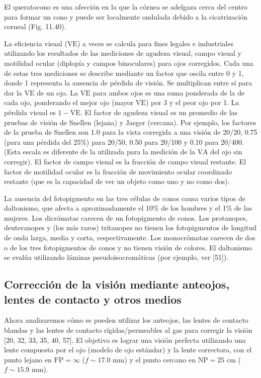 \documentclass[12pt]{book}
\begin{document}
El queratocono es una afección en la que la córnea se adelgaza cerca del centro para formar un cono y puede ser localmente ondulada debido a la cicatrización corneal (Fig. 11.40).

La eficiencia visual ($\text{VE}$) a veces se calcula para fines legales e industriales utilizando los resultados de las mediciones de agudeza visual, campo visual y motilidad ocular (diplopía y campos binoculares) para ojos corregidos. Cada una de estas tres mediciones se describe mediante un factor que oscila entre 0 y 1, donde 1 representa la ausencia de pérdida de visión. Se multiplican entre sí para dar la $\text{VE}$ de un ojo. La $\text{VE}$ para ambos ojos es una suma ponderada de la de cada ojo, ponderando el mejor ojo (mayor $\text{VE}$) por 3 y el peor ojo por 1. La pérdida visual es $1 - \text{VE}$. El factor de agudeza visual es un promedio de las pruebas de visión de Snellen (lejana) y Jaeger (cercana). Por ejemplo, los factores de la prueba de Snellen son 1.0 para la vista corregida a una visión de 20/20, 0.75 (para una pérdida del 25\%) para 20/50, 0.50 para 20/100 y 0.10 para 20/400. (Esta escala es diferente de la utilizada para la medición de la $\text{VA}$ del ojo sin corregir). El factor de campo visual es la fracción de campo visual restante. El factor de motilidad ocular es la fracción de movimiento ocular coordinado restante (que es la capacidad de ver un objeto como uno y no como dos).

La ausencia del fotopigmento en las tres células de conos causa varios tipos de daltonismo, que afecta a aproximadamente el 10\% de los hombres y el 1\% de las mujeres. Los dicrómatas carecen de un fotopigmento de conos. Los protanopes, deuteranopes y (los más raros) tritanopes no tienen los fotopigmentos de longitud de onda larga, media y corta, respectivamente. Los monocrómatas carecen de dos o de los tres fotopigmentos de conos y no tienen visión de colores. El daltonismo se evalúa utilizando láminas pseudoisocromáticas (por ejemplo, ver [51]).


\subsection{Corrección de la visión mediante anteojos, lentes de contacto y otros medios}

Ahora analizaremos cómo se pueden utilizar los anteojos, las lentes de contacto blandas y las lentes de contacto rígidas/permeables al gas para corregir la visión [20, 32, 33, 35, 40, 57]. El objetivo es lograr una visión perfecta utilizando una lente compuesta por el ojo (modelo de ojo estándar) y la lente correctora, con el punto lejano en $\text{FP} = \infty$ ($f \sim 17.0\text{ mm}$) y el punto cercano en $\text{NP} = 25\text{ cm}$ ($f \sim 15.9\text{ mm}$).
\end{document}
